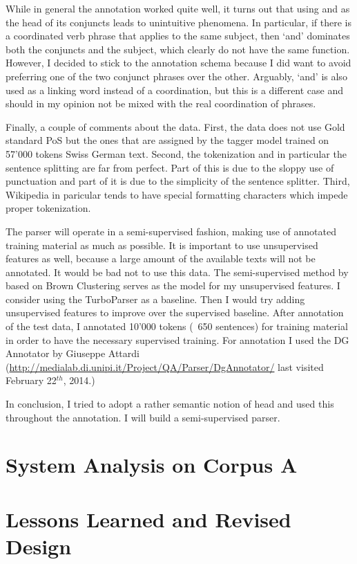 \documentclass[11pt,letterpaper, covington]{article}
\begin{document}
While in general the annotation worked quite well, it turns out that using and as the head of its conjuncts leads to unintuitive phenomena. In particular, if there is a coordinated verb phrase that applies to the same subject, then `and' dominates both the conjuncts and the subject, which clearly do not have the same function. However, I decided to stick to the annotation schema because I did want to avoid preferring one of the two conjunct phrases over the other. Arguably, `and' is also used as a linking word instead of a coordination, but this is a different case and should in my opinion not be mixed with the real coordination of phrases. 

Finally, a couple of comments about the data. First, the data does not use Gold standard PoS but the ones that are assigned by the tagger model trained on 57'000 tokens Swiss German text. Second, the tokenization and in particular the sentence splitting are far from perfect. Part of this is due to the sloppy use of punctuation and part of it is due to the simplicity of the sentence splitter. Third, Wikipedia in paricular tends to have special formatting characters which impede proper tokenization. 

The parser will operate in a semi-supervised fashion, making use of annotated training material as much as possible. It is important to use unsupervised features as well, because a large amount of the available texts will not be annotated. It would be bad not to use this data. The semi-supervised method by \citet{KCC08} based on Brown Clustering serves as the model for my unsupervised features.  I consider using the TurboParser \citep{MSXAF10} as a baseline. Then I would try adding unsupervised features to improve over the supervised baseline.
After annotation of the test data, I annotated 10'000 tokens (~650 sentences) for training material in order to have the necessary supervised training. For annotation I used the DG Annotator by Giuseppe Attardi (\url{http://medialab.di.unipi.it/Project/QA/Parser/DgAnnotator/} last visited February 22$^{th}$, 2014.) 

In conclusion, I tried to adopt a rather semantic notion of head and used this throughout the annotation. I will build a semi-supervised parser.

\section{System Analysis on Corpus A}

\section{Lessons Learned and Revised Design}
\end{document}
